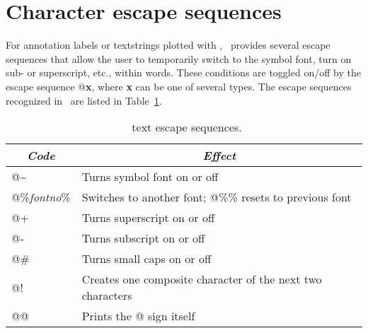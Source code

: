 \section{Character escape sequences}
\label{sec:escape}

For annotation labels or textstrings plotted with ,
\GMT\ provides several escape sequences that allow the user to
temporarily switch to the symbol font, turn on sub- or superscript,
etc., within words.  These conditions are toggled on/off by the
escape sequence @{\bf x}, where {\bf x} can be one of several types.
The escape sequences recognized in \GMT\ are listed in Table~\ref{tbl:escape}. 

\begin{table}[H]
\centering
\begin{tabular}{|l|l|} \hline
\multicolumn{1}{|c|}{\emph{Code}}	&	\multicolumn{1}{c|}{\emph{Effect}} \\ \hline
@\~	&	Turns symbol font on or off \\ \hline 
@\%{\it fontno}\%	&	Switches to another font; @\%\% resets to previous font \\ \hline 
@+	&	Turns superscript on or off \\ \hline 
@-	&	Turns subscript on or off \\ \hline 
@\#	&	Turns small caps on or off \\ \hline 
@!	&	Creates one composite character of the next two characters \\ \hline 
@@	&	Prints the @ sign itself \\ \hline 
\end{tabular}
\caption{\gmt\ text escape sequences.}
\label{tbl:escape}
\end{table}


